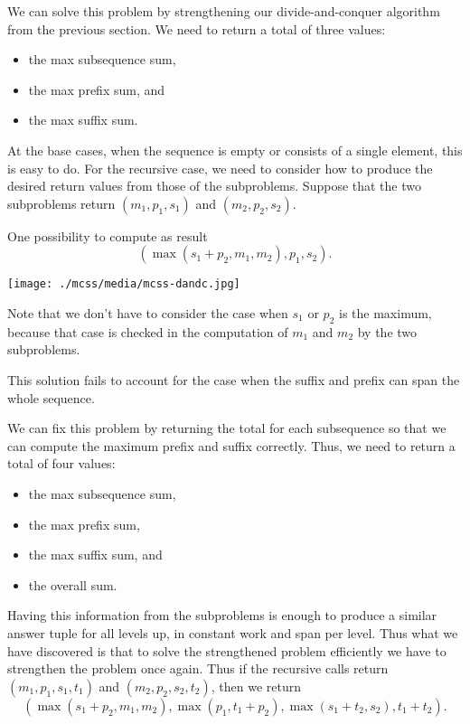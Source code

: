\begin{cluster}
\label{grp:grm:mcss::solving-mcssps}

\begin{gram}
\label{grm:mcss::solving-mcssps}
We can solve this problem by strengthening our divide-and-conquer
algorithm from the previous section.
We need to return a total of three values: 
\begin{itemize}
\item the max subsequence sum,
\item the max prefix sum, and
\item the max suffix sum.
\end{itemize}

At the base cases, when the sequence is empty or consists of a single
element, this is easy to do.
For the recursive case, we need to consider how to produce the desired
return values from those of the subproblems.
Suppose that the two subproblems return  $(m_1, p_1, s_1)$ and $(m_2, p_2, s_2)$.

One possibility to compute as result
\[
  (\max(s_1+p_2, m_1, m_2), p_1, s_2).
\]


\texttt{[image: ./mcss/media/mcss-dandc.jpg]}


Note that we don't have to consider the case when $s_1$ or $p_2$ is
the maximum, because that case is checked in the computation of $m_1$
and $m_2$ by the two subproblems.


This solution fails to account for the case when the suffix and
prefix can span the whole sequence.

We can fix this problem by returning the total for each subsequence so
that we can compute the maximum prefix and suffix correctly.  Thus, we
need to return a total of four values: 
\begin{itemize}
\item the max subsequence sum,
\item the
max prefix sum, 
\item the max suffix sum, and 
\item the overall sum.
\end{itemize}

Having this information from the subproblems is enough to produce a
similar answer tuple for all levels up, in constant work and span per
level. Thus what we have discovered is that to solve the strengthened
problem efficiently we have to strengthen the problem once again.
Thus if the recursive calls return $(m_1, p_1, s_1, t_1)$ and $(m_2,
p_2, s_2, t_2)$, then we return
\[
  (\max(s_1+p_2, m_1, m_2), \max(p_1,
  t_1+p_2), \max(s_1+t_2, s_2), t_1+t_2).
\]

\end{gram}
\end{cluster}

